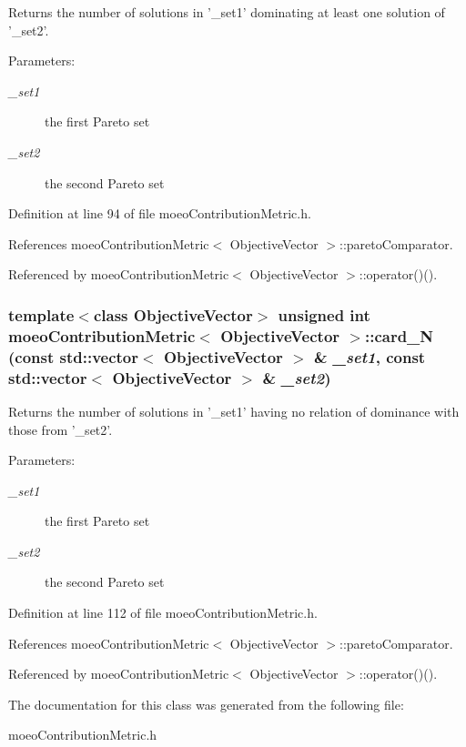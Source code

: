 Returns the number of solutions in '\_\-set1' dominating at least one solution of '\_\-set2'. 

\begin{Desc}
\item[Parameters:]
\begin{description}
\item[{\em \_\-set1}]the first Pareto set \item[{\em \_\-set2}]the second Pareto set \end{description}
\end{Desc}


Definition at line 94 of file moeo\-Contribution\-Metric.h.

References moeo\-Contribution\-Metric$<$ Objective\-Vector $>$::pareto\-Comparator.

Referenced by moeo\-Contribution\-Metric$<$ Objective\-Vector $>$::operator()().
\subsubsection{\setlength{\rightskip}{0pt plus 5cm}template$<$class Objective\-Vector$>$ unsigned int \bf{moeo\-Contribution\-Metric}$<$ Objective\-Vector $>$::card\_\-N (const std::vector$<$ Objective\-Vector $>$ \& {\em \_\-set1}, const std::vector$<$ Objective\-Vector $>$ \& {\em \_\-set2})\hspace{0.3cm}{\tt  [inline, private]}}\label{classmoeoContributionMetric_df26b17120ed2271a6d1ec9c8c77b451}


Returns the number of solutions in '\_\-set1' having no relation of dominance with those from '\_\-set2'. 

\begin{Desc}
\item[Parameters:]
\begin{description}
\item[{\em \_\-set1}]the first Pareto set \item[{\em \_\-set2}]the second Pareto set \end{description}
\end{Desc}


Definition at line 112 of file moeo\-Contribution\-Metric.h.

References moeo\-Contribution\-Metric$<$ Objective\-Vector $>$::pareto\-Comparator.

Referenced by moeo\-Contribution\-Metric$<$ Objective\-Vector $>$::operator()().

The documentation for this class was generated from the following file:\begin{CompactItemize}
\item 
moeo\-Contribution\-Metric.h\end{CompactItemize}
